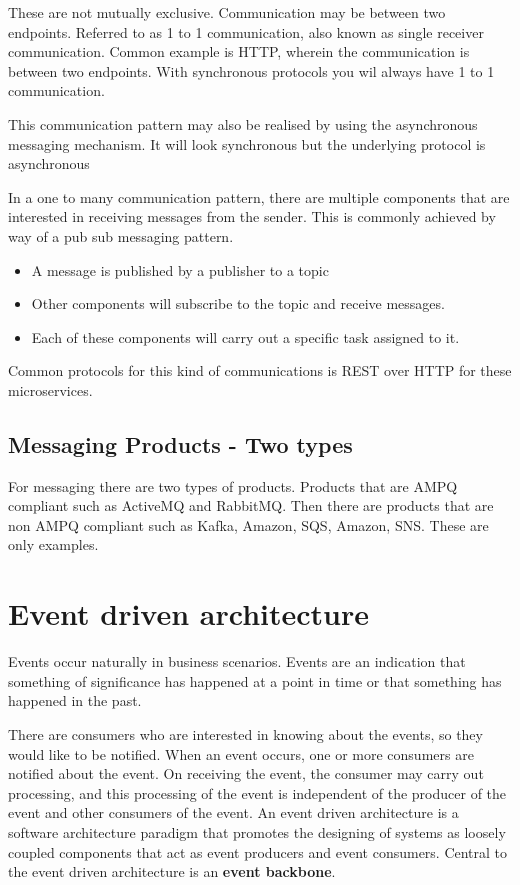 These are not mutually exclusive.
Communication may be between two endpoints.
Referred to as 1 to 1 communication, also known as single receiver communication.
Common example is HTTP, wherein the communication is between two endpoints.
With synchronous protocols you wil always have 1 to 1 communication.

This communication pattern may also be realised by using the asynchronous messaging mechanism.
It will look synchronous but the underlying protocol is asynchronous

In a one to many communication pattern, there are multiple components that are interested in receiving messages from the sender.
This is commonly achieved by way of a pub sub messaging pattern.
\begin{itemize}
    \item A message is published by a publisher to a topic
    \item Other components will subscribe to the topic and receive messages.
    \item Each of these components will carry out a specific task assigned to it.
\end{itemize}

Common protocols for this kind of communications is REST over HTTP for these microservices.

\subsection{Messaging Products - Two types}
For messaging there are two types of products.
Products that are AMPQ compliant such as ActiveMQ and RabbitMQ.
Then there are products that are non AMPQ compliant such as Kafka, Amazon, SQS, Amazon, SNS. These are only examples.



\section{Event driven architecture}
Events occur naturally in business scenarios.
Events are an indication that something of significance has happened at a point in time or that something has happened in the past.

There are consumers who are interested in knowing about the events, so they would like to be notified.
When an event occurs, one or more consumers are notified about the event.
On receiving the event, the consumer may carry out processing, and this processing of the event is independent of the producer of the event and other consumers of the event.
An event driven architecture is a software architecture paradigm that promotes the designing of systems as loosely coupled components that act as event producers and event consumers.
Central to the event driven architecture is an \textbf{event backbone}.

